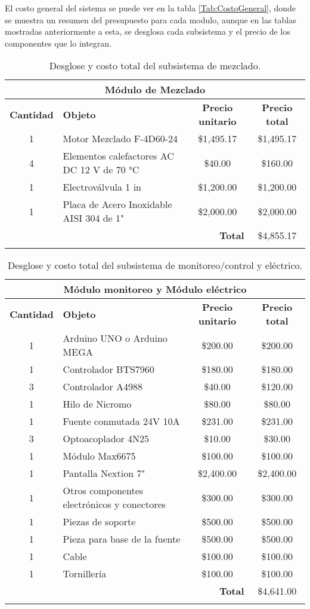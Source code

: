\documentclass[14pt,oneside]{extarticle} %
\begin{document}
El costo general del sistema se puede ver en la tabla \ref{Tab:CostoGeneral}, donde se muestra un resumen del presupuesto para cada modulo, aunque en las tablas mostradas anteriormente a esta, se desglosa cada subsistema y el precio de los componentes que lo integran.

\begin{longtable}{|c|l|c|c|}
\hline
\multicolumn{4}{|c|}{\textbf{Módulo de Mezclado}} \\ \hline
\textbf{\centering Cantidad} & \textbf{\centering Objeto} & \textbf{\centering Precio unitario} & \textbf{\centering Precio total} \\ \hline
1 & Motor Mezclado F-4D60-24 & \$1,495.17 & \$1,495.17 \\ \hline
4 & Elementos calefactores AC DC 12 V de 70 °C & \$40.00 & \$160.00 \\ \hline
1 & Electroválvula 1 in & \$1,200.00 & \$1,200.00 \\ \hline
1 & Placa de Acero Inoxidable AISI 304 de 1" & \$2,000.00 & \$2,000.00 \\ \hline
\multicolumn{3}{|r|}{\textbf{Total}} & \$4,855.17 \\ \hline
\caption{Desglose y costo total del subsistema de mezclado.}
\end{longtable}

\begin{longtable}{|c|l|c|c|}
\hline
\multicolumn{4}{|c|}{\textbf{Módulo monitoreo y Módulo eléctrico}} \\ \hline
\textbf{\centering Cantidad} & \textbf{\centering Objeto} & \textbf{\centering Precio unitario} & \textbf{\centering Precio total} \\ \hline
1 & Arduino UNO o Arduino MEGA & \$200.00 & \$200.00 \\ \hline
1 & Controlador BTS7960 & \$180.00 & \$180.00 \\ \hline
3 & Controlador A4988 & \$40.00 & \$120.00 \\ \hline
1 & Hilo de Nicromo & \$80.00 & \$80.00 \\ \hline
1 & Fuente conmutada 24V 10A & \$231.00 & \$231.00 \\ \hline
3 & Optoacoplador 4N25 & \$10.00 & \$30.00 \\ \hline
1 & Módulo Max6675 & \$100.00 & \$100.00 \\ \hline
1 & Pantalla Nextion 7" & \$2,400.00 & \$2,400.00 \\ \hline
1 & Otros componentes electrónicos y conectores & \$300.00 & \$300.00 \\ \hline
1 & Piezas de soporte & \$500.00 & \$500.00 \\ \hline
1 & Pieza para base de la fuente & \$500.00 & \$500.00 \\ \hline
1 & Cable & \$100.00 & \$100.00 \\ \hline
1 & Tornillería & \$100.00 & \$100.00 \\ \hline
\multicolumn{3}{|r|}{\textbf{Total}} & \$4,641.00 \\ \hline
\caption{Desglose y costo total del subsistema de monitoreo/control y eléctrico.}
\end{longtable}
\end{document}
